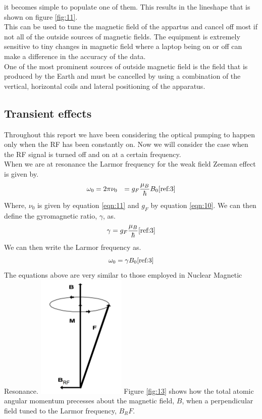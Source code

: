 \documentclass[twocolumn]{article}
\begin{document}
it becomes simple to populate one of them.
This results in the lineshape that is shown on figure \ref{fig:11}.
\\
This can be used to tune the magnetic field of the appartus and cancel off most 
if not all of the outside sources of magnetic fields. The equipment is 
extremely sensitive to tiny changes in magnetic field where a laptop being on 
or off can make a difference in the accuracy of the data.
\\
One of the most prominent sources of outside magnetic field is the field that 
is produced by the Earth and must be cancelled by using a combination of the 
vertical, horizontal coils and lateral positioning of the apparatus.

\subsection{Transient effects}
Throughout this report we have been considering the optical pumping to happen 
only when the RF has been constantly on. Now we will consider the case when the 
RF signal is turned off and on at a certain frequency.
\\
When we are at resonance the Larmor frequency for the weak field Zeeman effect 
is given by.
\begin{equation}
\begin{aligned}
\omega_0 &= 2\pi\nu_0 
         &= g_F\frac{\mu_B}{\hbar}B_0
\label{eqn:17}
\cite{ref:3}
\end{aligned}
\end{equation}
Where, $\nu_0$ is given by equation \ref{eqn:11} and $g_F$ by equation 
\ref{eqn:10}. We can then define the gyromagnetic ratio, $\gamma$, as.
\begin{equation}
\gamma = g_F\frac{\mu_B}{\hbar}
\label{eqn:18}
\cite{ref:3}
\end{equation}
We can then write the Larmor frequency as.
\begin{equation}
\omega_0 = \gamma B_0
\label{eqn:19}
\cite{ref:3}
\end{equation}
The equations above are very similar to those employed in Nuclear Magnetic 
Resonance.
\center
\includegraphics[width=0.4\linewidth]{pictures/rf-larmor.png}
\label{fig:13}
\justify
Figure \ref{fig:13} shows how the total atomic angular momentum precesses 
about the magnetic field, $B$, when a perpendicular field tuned to the Larmor 
frequency, $B_RF$.
\end{document}
